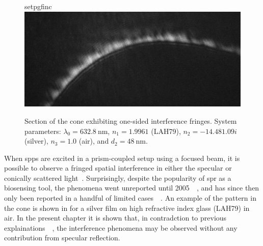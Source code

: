 \begin{figure}[ht]
  \centering
  {setpgfinc}
  \includegraphics[keepaspectratio,width=15.5cm]{interference/figures/coneintro.jpg}
  \caption{Section of the cone exhibiting one-sided interference fringes.
    System parameters: $\lambda_0 = \SI{632.8}{\nano\meter}$,
    $n_1=1.9961$ (LAH79), $n_2 = \num{-14.48+1.09i}$ (silver), $n_3=1.0$
    (air), and $d_2=\SI{48}{\nano\meter}$.}\label{fig:coneintrofig}
\end{figure}
When \glspl{spp} are excited in a prism-coupled setup using a focused beam, it is
possible to observe a fringed spatial interference in either the
specular or conically scattered light~\cite{webster2013interference}.
Surprisingly, despite the popularity of \gls{spr} as a biosensing tool, the
phenomena went unreported until
2005~\cite{schumann2008near}~\cite{andaloro2005optical}, and has since then
only been reported in a handful of limited
cases~\cite{shan2009measuring}~\cite{simon2007observation}.  An example of the
pattern in the cone is shown in  for a silver film on
high refractive index glass (LAH79) in air.  In the present chapter it is
shown that, in contradction to previous
explainations~\cite{schumann2008near}~\cite{andaloro2005optical}, the
interference phenomena may be observed without any contribution from specular
reflection.

